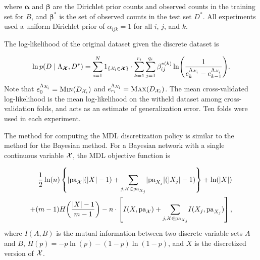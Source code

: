 \noindent
where $\bm{\alpha}$ and $\bm{\beta}$ are the Dirichlet prior counts and observed counts in the training set for $B$, and $\bm{\beta}^*$ is the set of observed counts in the test set $D^*$.
All experiments used a uniform Dirichlet prior of $\alpha_{ijk} = 1$ for all $i$, $j$, and $k$.

The log-likelihood of the original dataset given the discrete dataset is

\begin{equation}
  \ln p\paren{D\mid \discset, D^*} = \sum_{i=1}^N
  1_{\curly{ \cX_i \in \bm{\cX }}}\cdot \sum_{k=1}^{r_i}  \sum_{j=1}^{q_i} \beta_{ij}^{*(k)} \ln \paren{
    \frac{
      1
    }{
      e^{\Lambda_{\cX_i}}_{k} - e^{\Lambda_{\cX_i}}_{k-1}
    }
  }\text{.}
\end{equation}
Note that $e^{\Lambda_{\cX_i}}_{0} = \textsc{Min}\paren{D_{\cX_i}}$ and $e^{\Lambda_{\cX_i}}_{r_i} = \textsc{Max}\paren{D_{\cX_i}}$.
\noindent
The mean cross-validated log-likelihood is the mean log-likelihood on the witheld dataset among cross-validation folds, and acts as an estimate of generalization error.
Ten folds were used in each experiment.

The method for computing the MDL discretization policy is similar to the method for the Bayesian method.
For a Bayesian network with a single continuous variable $\mathcal{X}$, the MDL objective function is

\begin{equation}
  \label{eqn:MDL}
  \begin{aligned}
  \frac{1}{2} \ln(n) \left\lbrace  \lvert \Pa_{\cX} \rvert (\lvert X \rvert - 1) +
   {\sum_{j,\cX \in \Pa_{X_j}}} \lvert \Pa_{X_j} \rvert (\lvert X_j \rvert - 1) \right\rbrace + \ln(|X|) \\
   + (m-1) H \paren{\frac{|X| - 1}{m -1}} -n \cdot \left[ I(X,\Pa_{\cX}) + {\sum_{j,\cX \in \Pa_{X_j}}} I(X_j, \Pa_{X_j}) \right]\text{,}
  \end{aligned}
\end{equation}
where $I(A,B)$ is the mutual information between two discrete variable sets $A$ and $B$, ${H(p) = -p \ln(p) - (1-p) \ln(1-p)}$, and $X$ is the discretized version of $\mathcal{X}$.

